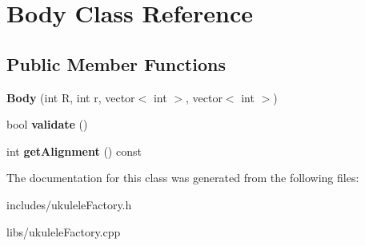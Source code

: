 \hypertarget{class_body}{}\section{Body Class Reference}
\label{class_body}
\subsection*{Public Member Functions}
\begin{DoxyCompactItemize}
\item 
\hypertarget{class_body_a23d10a63b0e8e30b1c102dbfd202a8fb}{}\label{class_body_a23d10a63b0e8e30b1c102dbfd202a8fb} 
{\bfseries Body} (int R, int r, vector$<$ int $>$, vector$<$ int $>$)
\item 
\hypertarget{class_body_ac5677819724a41c46e33259bf3ec0936}{}\label{class_body_ac5677819724a41c46e33259bf3ec0936} 
bool {\bfseries validate} ()
\item 
\hypertarget{class_body_ab6e8db9ffceb6931c5891de9eb2ac8e7}{}\label{class_body_ab6e8db9ffceb6931c5891de9eb2ac8e7} 
int {\bfseries get\+Alignment} () const
\end{DoxyCompactItemize}


The documentation for this class was generated from the following files\+:\begin{DoxyCompactItemize}
\item 
includes/ukulele\+Factory.\+h\item 
libs/ukulele\+Factory.\+cpp\end{DoxyCompactItemize}
